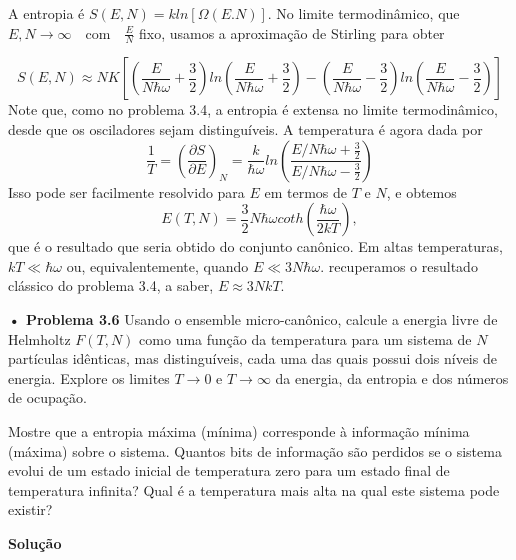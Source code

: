 \documentclass[12pt]{article}
\begin{document}
A entropia é $S(E,N) = k ln[\Omega(E. N)]$. No limite termodinâmico, que $E,N \to \infty \quad \text{com} \quad \frac{E}{N}$ fixo, usamos a aproximação de Stirling para obter

\begin{equation}
    S(E, N) \approx NK \left[ \left(\frac{E}{N \hbar \omega} + \frac{3}{2} \right) ln\left(\frac{E}{N \hbar \omega} + \frac{3}{2} \right) - \left(\frac{E}{N \hbar \omega} - \frac{3}{2} \right) ln\left(\frac{E}{N \hbar \omega} - \frac{3}{2} \right)\right]
\end{equation}
Note que, como no problema 3.4, a entropia é extensa no limite termodinâmico, desde que os osciladores sejam distinguíveis. A temperatura é agora dada por
\begin{equation}
    \frac{1}{T} = \left(\frac{\partial S}{\partial E}\right)_{N} = \frac{k}{\hbar \omega} ln\left(\frac{E/N \hbar \omega + \frac{3}{2}}{E/N \hbar \omega - \frac{3}{2}} \right)
\end{equation}
Isso pode ser facilmente resolvido para $E$ em termos de $T$ e $N$, e obtemos
\begin{equation}
    E(T, N) = \frac{3}{2} N \hbar \omega coth\left(\frac{\hbar \omega}{2 k T}\right),
\end{equation}
que é o resultado que seria obtido do conjunto canônico. Em altas temperaturas, $kT \ll \hbar \omega$ ou, equivalentemente, quando $E \ll 3N\hbar \omega$. recuperamos o resultado clássico do problema 3.4, a saber, $E \approx 3NkT$.

\textbf{• Problema 3.6} Usando o ensemble micro-canônico, calcule a energia livre de Helmholtz $F(T, N)$ como uma função da temperatura para um sistema de $N$ partículas idênticas, mas distinguíveis, cada uma das quais possui dois níveis de energia. Explore os limites $T \rightarrow 0$ e $T \rightarrow \infty$ da energia, da entropia e dos números de ocupação.

Mostre que a entropia máxima (mínima) corresponde à informação mínima (máxima) sobre o sistema. Quantos bits de informação são perdidos se o sistema evolui de um estado inicial de temperatura zero para um estado final de temperatura infinita? Qual é a temperatura mais alta na qual este sistema pode existir?

\textbf{Solução}
\end{document}
